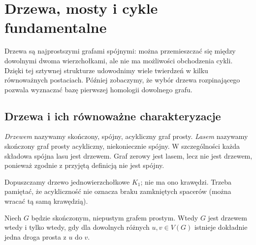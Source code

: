 \chapter{Drzewa, mosty i cykle fundamentalne}
\label{ch:tg-drzewa}

Drzewa są najprostszymi grafami spójnymi: można przemieszczać się
między dowolnymi dwoma wierzchołkami, ale nie ma możliwości
obchodzenia cykli. Dzięki tej sztywnej strukturze udowodnimy
wiele twierdzeń w kilku równoważnych postaciach. Później
zobaczymy, że wybór drzewa rozpinającego pozwala wyznaczać
bazę pierwszej homologii dowolnego grafu.

\section{Drzewa i ich równoważne charakteryzacje}
\label{sec:tg-def-drzewo}

\begin{definicja}
\emph{Drzewem} nazywamy skończony, spójny, acykliczny
graf prosty. \emph{Lasem} nazywamy skończony graf prosty
acykliczny, niekoniecznie spójny. W szczególności
każda składowa spójna lasu jest drzewem.
Graf zerowy jest lasem, lecz nie jest drzewem,
ponieważ zgodnie z przyjętą definicją nie jest spójny.
\end{definicja}

Dopuszczamy drzewo jednowierzchołkowe $K_1$; nie ma
ono krawędzi. Trzeba pamiętać, że acykliczność
nie oznacza braku zamkniętych spacerów (można
wracać tą samą krawędzią).

\begin{twierdzenie}
Niech $G$ będzie skończonym, niepustym grafem prostym.
Wtedy $G$ jest drzewem wtedy i tylko wtedy, gdy
dla dowolnych różnych $u,v\in V(G)$ istnieje
dokładnie jedna droga prosta z $u$ do $v$.
\end{twierdzenie}

